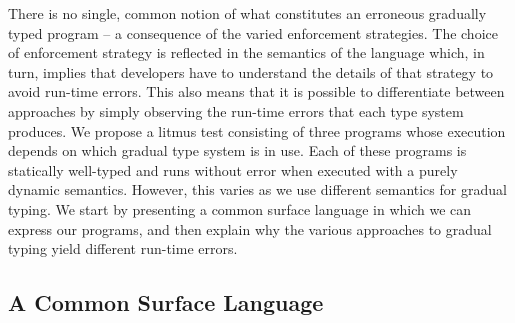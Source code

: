 \documentclass[a4paper,USenglish]{lipics-v2018}
\begin{document}
\vspace{-7mm}
\noindent
There is no single, common notion of what constitutes an erroneous gradually
typed program -- a consequence of the varied enforcement strategies. The choice
of enforcement strategy is reflected in the semantics of the language
which, in turn, implies that developers have to understand the details of
that strategy to avoid run-time errors. This also
means that it is possible to differentiate between approaches by simply
observing the run-time errors that each type system produces. We propose a
litmus test consisting of three programs whose execution depends on which
gradual type system is in use. Each of these programs is statically 
well-typed and runs without error when executed with a purely dynamic semantics.
However, this varies as we use different semantics for gradual typing.
We start by presenting a common surface language in which we can
express our programs, and then explain why the various approaches to gradual
typing yield different run-time errors.

\subsection{A Common Surface Language}
\end{document}
